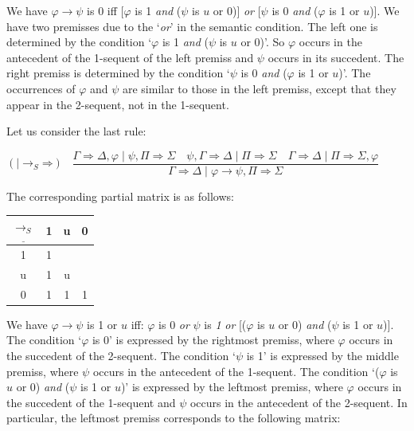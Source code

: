 \documentclass[10pt,a4paper]{article}
\theoremstyle{definition}
\newcommand{\3}{\vspace{.3in}}
\newcommand{\2}{\vspace{.2in}}
\newcommand{\1}{\vspace{.1in}}
\newcommand{\5}{\vspace{.05in}}
\begin{document}
\1

We have $\varphi\rightarrow\psi$ is 0 iff [$\varphi$ is 1 \textit{and} ($\psi$ is $u$ or 0)] \textit{or} [$\psi$ is 0 \textit{and} ($\varphi$ is 1 or $u$)].  We have two premisses due to the `\textit{or}' in the semantic condition. The left one is determined by the condition `$\varphi$ is 1 \textit{and} ($\psi$ is $u$ or 0)'. So $ \varphi $ occurs in the antecedent of the 1-sequent of the left premiss and $ \psi $ occurs in its succedent. The right premiss is determined by the condition `$\psi$ is 0 \textit{and} ($\varphi$ is 1 or $u$)'. The occurrences of $ \varphi $ and $ \psi$ are similar to those in the left premiss, except that they appear in the 2-sequent, not in the 1-sequent.

Let us consider the last rule:

\begin{flushleft}
	{\small $(\mathord{\mid \rightarrow_S}\mathord{\Rightarrow})$ \ $\dfrac{\Gamma
			\Rightarrow \Delta, \varphi \mid \psi, \Pi\Rightarrow\Sigma \quad\psi, \Gamma\Rightarrow\Delta \mid
			\Pi \Rightarrow \Sigma \quad \Gamma\Rightarrow\Delta \mid \Pi\Rightarrow\Sigma, \varphi} {\Gamma
			\Rightarrow \Delta \mid \varphi\rightarrow\psi, \Pi\Rightarrow\Sigma}$}
\end{flushleft} 

The corresponding partial matrix is as follows:

\1

\begin{tabular}{|c|ccc|}
	\hline
	$\underline{\rightarrow_S} $ & 1 & u & 0 \\
	\hline
	1 & 1 &  &  \\
	u & 1 & u &  \\
	0 & 1 & 1 & 1 \\
	\hline
\end{tabular} 

\1

We have $\varphi\rightarrow\psi$ is 1 or $u$ iff: $\varphi$ is 0 \textit{or} $\psi$ is \textit{1} \textit{or} [($\varphi$ is $u$ or 0) \textit{and} ($\psi$ is 1 or $u$)]. The condition `$\varphi$ is 0' is expressed by the rightmost premiss, where $\varphi$ occurs in the succedent of the 2-sequent.  The condition `$\psi$ is 1' is expressed by the middle premiss, where $\psi$ occurs in the antecedent of the 1-sequent. The condition `($\varphi$ is $u$ or 0) \textit{and} ($\psi$ is 1 or $u$)' is expressed by the leftmost premiss, where $\varphi$ occurs in the succedent of the 1-sequent and $\psi$ occurs in the antecedent of the 2-sequent. In particular, the leftmost premiss corresponds to the following matrix:
\end{document}
